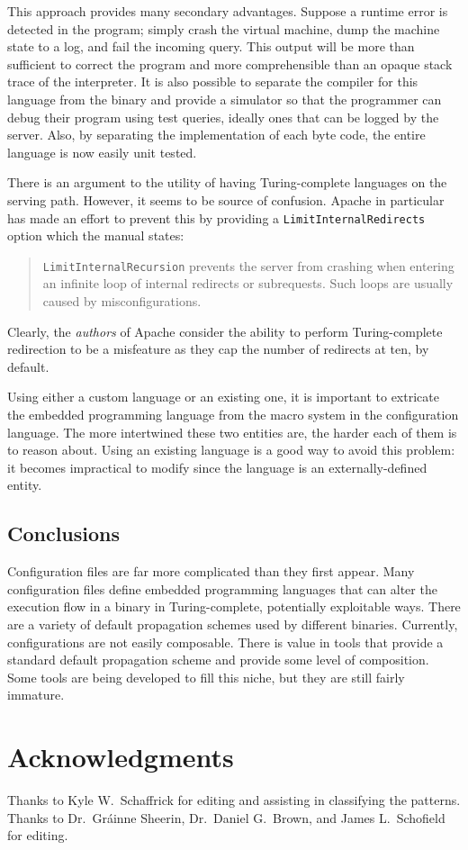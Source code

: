 \documentclass[letterpaper,twocolumn,10pt]{article}
\begin{document}
This approach provides many secondary advantages. Suppose a runtime error is detected in the program; simply crash the virtual machine, dump the machine state to a log, and fail the incoming query. This output will be more than sufficient to correct the program and more comprehensible than an opaque stack trace of the interpreter. It is also possible to separate the compiler for this language from the binary and provide a simulator so that the programmer can debug their program using test queries, ideally ones that can be logged by the server. Also, by separating the implementation of each byte code, the entire language is now easily unit tested.

There is an argument to the utility of having Turing-complete languages on the serving path. However, it seems to be source of confusion. Apache in particular has made an effort to prevent this by providing a \texttt{LimitInternalRedirects} option which the manual states:

\begin{quote}
\texttt{LimitInternalRecursion} prevents the server from crashing when entering an infinite loop of internal redirects or subrequests. Such loops are usually caused by misconfigurations.
\end{quote}

\noindent Clearly, the \emph{authors} of Apache consider the ability to perform Turing-complete redirection to be a misfeature as they cap the number of redirects at ten, by default.

Using either a custom language or an existing one, it is important to extricate the embedded programming language from the macro system in the configuration language. The more intertwined these two entities are, the harder each of them is to reason about. Using an existing language is a good way to avoid this problem: it becomes impractical to modify since the language is an externally-defined entity.

\subsection{Conclusions}

Configuration files are far more complicated than they first appear. Many configuration files define embedded programming languages that can alter the execution flow in a binary in Turing-complete, potentially exploitable ways. There are a variety of default propagation schemes used by different binaries. Currently, configurations are not easily composable. There is value in tools that provide a standard default propagation scheme and provide some level of composition. Some tools are being developed to fill this niche, but they are still fairly immature.

\section{Acknowledgments}
Thanks to Kyle W.~Schaffrick for editing and assisting in classifying the patterns. Thanks to Dr.~Gr\'ainne Sheerin, Dr.~Daniel G.~Brown, and James L.~Schofield for editing.

{\footnotesize 
}

\theendnotes
\end{document}
